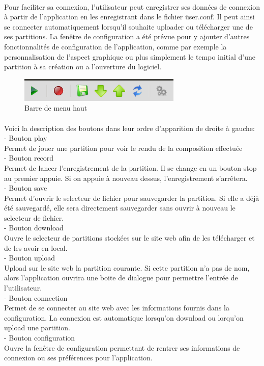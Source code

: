 \paragraph{}
Pour faciliter sa connexion, l'utilisateur peut enregistrer ses données de connexion à partir de l'application en les enregistrant dans le fichier 
\"user.conf\". Il peut ainsi se connecter automatiquement lorsqu'il souhaite uploader ou télécharger une de ses partitions. La fenêtre de configuration 
a été prévue pour y ajouter d'autres fonctionnalités de configuration de l'application, comme par exemple la personnalisation de l'aspect graphique ou 
plus simplement le tempo initial d'une partition à sa création ou a l'ouverture du logiciel.



\begin{figure}[H]
\centering
\includegraphics[scale=0.5]{TopApp}
\caption{Barre de menu haut}
\end{figure}
\paragraph{}
Voici la description des boutons dans leur ordre d'apparition de droite à gauche:\\
- Bouton play\\
Permet de jouer une partition pour voir le rendu de la composition effectuée\\
- Bouton record\\
Permet de lancer l'enregistrement de la partition. Il se change en un bouton stop au premier appuie. Si on appuie à nouveau dessus, 
l'enregistrement s'arrêtera.\\
- Bouton save\\
Permet d'ouvrir le selecteur de fichier pour sauvegarder la partition. Si elle a déjà été sauvegardé, elle sera directement sauvegarder sans 
ouvrir à nouveau le selecteur de fichier.\\
- Bouton download\\
Ouvre le selecteur de partitions stockées sur le site web afin de les télécharger et de les avoir en local.\\
- Bouton upload\\
Upload sur le site web la partition courante. Si cette partition n'a pas de nom, alors l'application ouvrira une boite de dialogue pour permettre 
l'entrée de l'utilisateur.\\
- Bouton connection\\
Permet de se connecter au site web avec les informations fournis dans la configuration. La connexion est automatique lorsqu'on download 
ou lorqu'on upload une partition.\\
- Bouton configuration\\
Ouvre la fenêtre de configuration permettant de rentrer ses informations de connexion ou ses préférences pour l'application.\\


